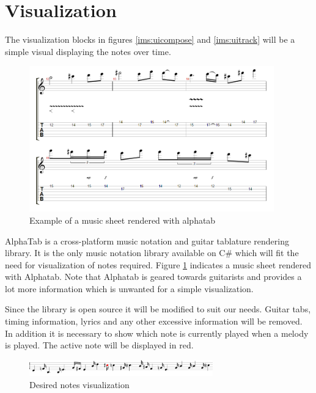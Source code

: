  
\section{Visualization}
The visualization blocks in figures \ref{ims:uicompose} and \ref{ims:uitrack} will be a simple visual displaying the notes over time. 


\begin{figure}
\centerline{\includegraphics[width=400px]{../images/alphatab_example.png}}
\caption{Example of a music sheet rendered with alphatab}
\label{ims:alphatab}
\end{figure}

AlphaTab is a cross-platform music notation and guitar tablature rendering library. It is the only music notation library available on C\# which will fit the need for visualization of notes required.
Figure \ref{ims:alphatab} indicates a music sheet rendered with Alphatab. Note that Alphatab is geared towards guitarists and provides a lot more information which is unwanted for a simple visualization. 

Since the library is open source it will be modified to suit our needs. Guitar tabs, timing information, lyrics and any other excessive information will be removed. In addition it is necessary to show which note is currently played when a melody is played. The active note will be displayed in red.

\begin{figure}
\centerline{\includegraphics[width=300px]{../images/music_sheet_visualization.png}}
\caption{Desired notes visualization}
\label{ims:uiharrynotesvisualization}
\end{figure}

